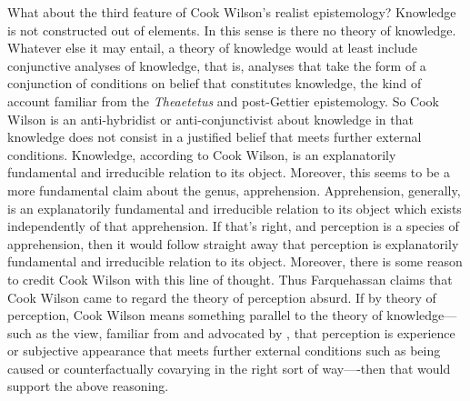 \documentclass[12pt]{article}
\begin{document}
What about the third feature of Cook Wilson's realist epistemology? Knowledge is not constructed out of elements. In this sense is there no theory of knowledge. Whatever else it may entail, a theory of knowledge would at least include conjunctive analyses of knowledge, that is, analyses that take the form of a conjunction of conditions on belief that constitutes knowledge, the kind of account familiar from the \emph{Theaetetus} and post-Gettier epistemology. So Cook Wilson is an anti-hybridist or anti-conjunctivist about knowledge in that knowledge does not consist in a justified belief that meets further external conditions. Knowledge, according to Cook Wilson, is an explanatorily fundamental and irreducible relation to its object. Moreover, this seems to be a more fundamental claim about the genus, apprehension. Apprehension, generally, is an explanatorily fundamental and irreducible relation to its object which exists independently of that apprehension. If that's right, and perception is a species of apprehension, then it would follow straight away that perception is explanatorily fundamental and irreducible relation to its object. Moreover, there is some reason to credit Cook Wilson with this line of thought. Thus Farquehassan claims that Cook Wilson came to regard the theory of perception absurd. If by theory of perception, Cook Wilson means something parallel to the theory of knowledge---such as the view, familiar from \citet{Grice:1962jw} and advocated by \citet{Hobbes:1651fk}, that perception is experience or subjective appearance that meets further external conditions such as being caused or counterfactually covarying in the right sort of way----then that would support the above reasoning. 
\end{document}
